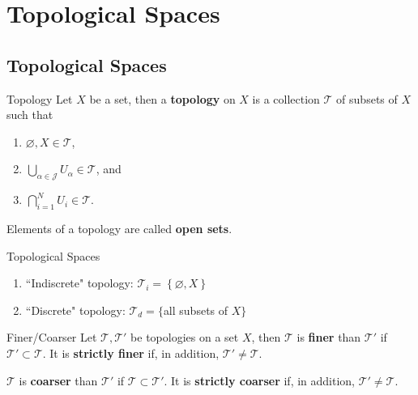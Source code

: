 \documentclass[10pt]{report}
\begin{document}
\tableofcontents



\chapter{Topological Spaces}


\section{Topological Spaces}


\begin{defn}{Topology}{}
	Let $X$ be a set, then a \textbf{topology} on $X$ is a collection $\mathcal{T}$ of subsets of $X$ such that
	\begin{enumerate}
		\item $\varnothing, X \in \mathcal{T}$,
		\item $\bigcup_{\alpha\in \mathcal{J}}U_\alpha \in \mathcal{T}$, and
		\item $\bigcap_{i=1}^N U_i \in \mathcal{T}$.
	\end{enumerate}
	Elements of a topology are called \textbf{open sets}.
\end{defn}

\begin{ex}{Topological Spaces}{}
\begin{enumerate}
	\item ``Indiscrete" topology: $\mathcal{T}_i = \left\{ \varnothing, X \right\}$ 
	\item ``Discrete" topology: $\mathcal{T}_d =\{$all subsets of $X\}$
\end{enumerate}
\end{ex}

\begin{defn}{Finer/Coarser}{}
	Let $\mathcal{T},\mathcal{T}'$ be topologies on a set $X$, then $\mathcal{T}$ is \textbf{finer} than $\mathcal{T}'$ if $\mathcal{T}' \subset \mathcal{T}$. It is \textbf{strictly finer} if, in addition, $\mathcal{T}' \neq \mathcal{T}$.

	$\mathcal{T}$ is \textbf{coarser} than $\mathcal{T}'$ if $\mathcal{T} \subset \mathcal{T}'$. It is \textbf{strictly coarser} if, in addition, $\mathcal{T}' \neq \mathcal{T}$.
\end{defn}
\end{document}
